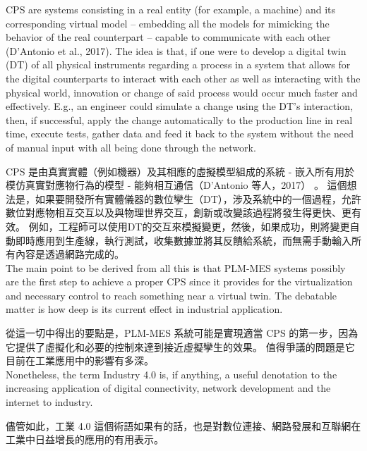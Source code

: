 \fontsize{14pt}{2.5pt}\sectionef 
{CPS are systems consisting in a real entity (for example, a machine) and its corresponding virtual model – embedding all the models for mimicking the behavior of the real counterpart – capable to communicate with each other (D’Antonio et al., 2017). The idea is that, if one were to develop a digital twin (DT) of all physical instruments regarding a process in a system that allows for the digital counterparts to interact with each other as well as interacting with the physical world, innovation or change of said process would occur much faster and effectively. E.g., an engineer could simulate a change using the DT’s interaction, then, if successful, apply the change automatically to the production line in real time, execute tests, gather data and feed it back to the system without the need of manual input with all being done through the network.}

\fontsize{14pt}{5pt}\sectionef
 {CPS 是由真實實體（例如機器）及其相應的虛擬模型組成的系統 - 嵌入所有用於模仿真實對應物行為的模型 - 能夠相互通信（D'Antonio 等人，2017） 。 這個想法是，如果要開發所有實體儀器的數位孿生（DT），涉及系統中的一個過程，允許數位對應物相互交互以及與物理世界交互，創新或改變該過程將發生得更快、更有效。 例如，工程師可以使用DT的交互來模擬變更，然後，如果成功，則將變更自動即時應用到生產線，執行測試，收集數據並將其反饋給系統，而無需手動輸入所有內容是透過網路完成的。}\\[15pt]

\fontsize{14pt}{2.5pt}\sectionef 
{The main point to be derived from all this is that PLM-MES systems possibly are the first step to achieve a proper CPS since it provides for the virtualization and necessary control to reach something near a virtual twin. The debatable matter is how deep is its current effect in industrial application.}

\fontsize{14pt}{5pt}\sectionef
 {從這一切中得出的要點是，PLM-MES 系統可能是實現適當 CPS 的第一步，因為它提供了虛擬化和必要的控制來達到接近虛擬孿生的效果。 值得爭議的問題是它目前在工業應用中的影響有多深。}\\[15pt]

\fontsize{14pt}{2.5pt}\sectionef 
{Nonetheless, the term Industry 4.0 is, if anything, a useful denotation to the increasing application of digital connectivity, network development and the internet to industry.}

\fontsize{14pt}{5pt}\sectionef
 {儘管如此，工業 4.0 這個術語如果有的話，也是對數位連接、網路發展和互聯網在工業中日益增長的應用的有用表示。}\\[15pt]

